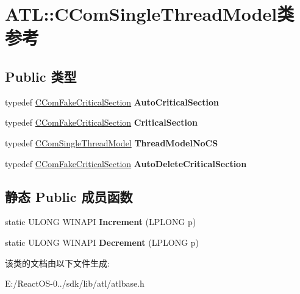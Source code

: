 \hypertarget{class_a_t_l_1_1_c_com_single_thread_model}{}\section{A\+TL\+:\+:C\+Com\+Single\+Thread\+Model类 参考}
\label{class_a_t_l_1_1_c_com_single_thread_model}
\subsection*{Public 类型}
\begin{DoxyCompactItemize}
\item 
\mbox{\label{class_a_t_l_1_1_c_com_single_thread_model_ae64ac83a23e0d2abad56abdf82356b64}} 
typedef \hyperlink{class_a_t_l_1_1_c_com_fake_critical_section}{C\+Com\+Fake\+Critical\+Section} {\bfseries Auto\+Critical\+Section}
\item 
\mbox{\label{class_a_t_l_1_1_c_com_single_thread_model_a8d4af5152e21ddb98ef4be2eef5fcc24}} 
typedef \hyperlink{class_a_t_l_1_1_c_com_fake_critical_section}{C\+Com\+Fake\+Critical\+Section} {\bfseries Critical\+Section}
\item 
\mbox{\label{class_a_t_l_1_1_c_com_single_thread_model_a3f1b2131c08ba69ef32e42bba63e347c}} 
typedef \hyperlink{class_a_t_l_1_1_c_com_single_thread_model}{C\+Com\+Single\+Thread\+Model} {\bfseries Thread\+Model\+No\+CS}
\item 
\mbox{\label{class_a_t_l_1_1_c_com_single_thread_model_aeb91ff7fe86abe1f81b0cf8c825ad0a8}} 
typedef \hyperlink{class_a_t_l_1_1_c_com_fake_critical_section}{C\+Com\+Fake\+Critical\+Section} {\bfseries Auto\+Delete\+Critical\+Section}
\end{DoxyCompactItemize}
\subsection*{静态 Public 成员函数}
\begin{DoxyCompactItemize}
\item 
\mbox{\label{class_a_t_l_1_1_c_com_single_thread_model_aae5f79c71bfe1079c7f248471d681418}} 
static U\+L\+O\+NG W\+I\+N\+A\+PI {\bfseries Increment} (L\+P\+L\+O\+NG p)
\item 
\mbox{\label{class_a_t_l_1_1_c_com_single_thread_model_a95d614189223b3bc70a164a5c0f64460}} 
static U\+L\+O\+NG W\+I\+N\+A\+PI {\bfseries Decrement} (L\+P\+L\+O\+NG p)
\end{DoxyCompactItemize}


该类的文档由以下文件生成\+:\begin{DoxyCompactItemize}
\item 
E\+:/\+React\+O\+S-\/0../sdk/lib/atl/atlbase.\+h\end{DoxyCompactItemize}
